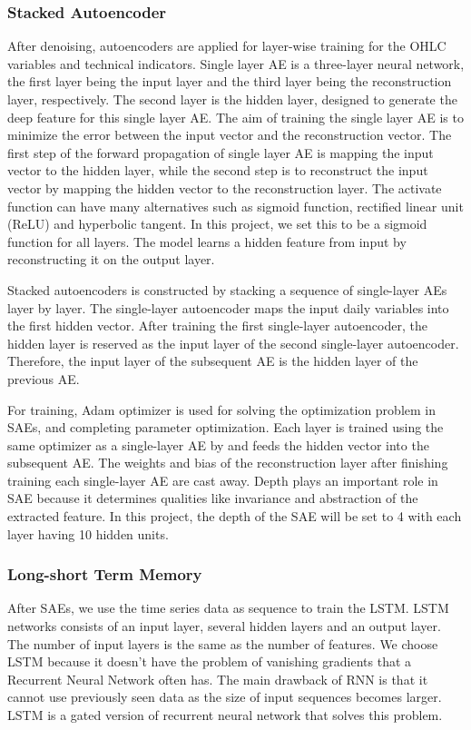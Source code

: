 \subsubsection{Stacked Autoencoder}
After denoising, autoencoders are applied for layer-wise training for the OHLC variables and technical indicators. Single layer AE is a three-layer neural network, the first layer being the input layer and the third layer being the reconstruction layer, respectively. The second layer is the hidden layer, designed to generate the deep feature for this single layer AE. The aim of training the single layer AE is to minimize the error between the input vector and the reconstruction vector. The first step of the forward propagation of single layer AE is mapping the input vector to the hidden layer, while the second step is to reconstruct the input vector by mapping the hidden vector to the reconstruction layer. The activate function can have many alternatives such as sigmoid function, rectified linear unit (ReLU) and hyperbolic tangent. In this project, we set this to be a sigmoid function for all layers. The model learns a hidden feature from input by reconstructing it on the output layer. 

Stacked autoencoders is constructed by stacking a sequence of single-layer AEs layer by layer. The single-layer autoencoder maps the input daily variables into the first hidden vector. After training the first single-layer autoencoder, the hidden layer is reserved as the input layer of the second single-layer autoencoder. Therefore, the input layer of the subsequent AE is the hidden layer of the previous AE. 

For training, Adam optimizer is used for solving the optimization problem in SAEs, and completing parameter optimization. Each layer is trained using the same optimizer as a single-layer AE by and feeds the hidden vector into the subsequent AE. The weights and bias of the reconstruction layer after finishing training each single-layer AE are cast away. Depth plays an important role in SAE because it determines qualities like invariance and abstraction of the extracted feature. In this project, the depth of the SAE will be set to 4 with each layer having 10 hidden units.

\subsubsection{Long-short Term Memory}
After SAEs, we use the time series data as sequence to train the LSTM. LSTM networks consists of an input layer, several hidden layers and an output layer. The number of input layers is the same as the number of features. We choose LSTM because it doesn’t have the problem of vanishing gradients that a Recurrent Neural Network often has. The main drawback of RNN is that it cannot use previously seen data as the size of input sequences becomes larger. LSTM is a gated version of recurrent neural network that solves this problem. 

